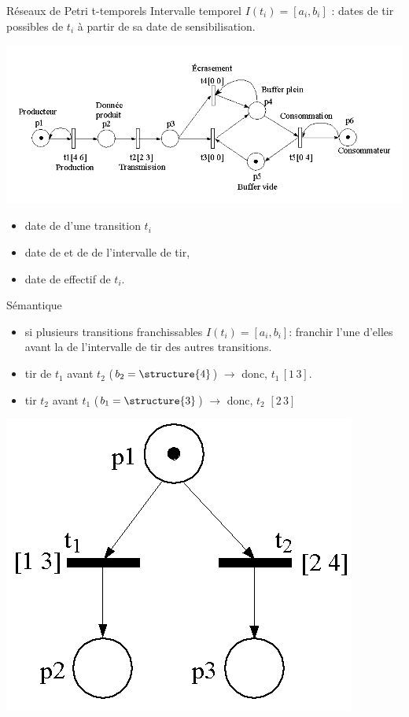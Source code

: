 \documentclass[compress]{beamer}
\begin{document}
\begin{frame}{Réseaux de Petri t-temporels}
Intervalle temporel $I(t_i)=[a_i,b_i]$ : dates de tir possibles de $t_i$ à partir de sa date de
sensibilisation.
\begin{center}
\includegraphics[width=.8\linewidth]{rdp_exo}
\end{center}
\begin{itemize}
\item date de  d'une transition $t_i$
\item date de  et de  de l'intervalle de tir,
\item date de  effectif de $t_i$.
\end{itemize}
\end{frame}

\begin{frame}{Sémantique}
\begin{itemize}
\item si plusieurs transitions franchissables $I(t_i)=[a_i,b_i]$: franchir l'une d'elles avant la
	 de l'intervalle de tir des autres transitions.
\item tir de $t_1$ avant $t_2$ ($b_2=\structure{4}$) $\rightarrow$ donc, $t_1 \, [1 \, 3]$.
\item tir $t_2$ avant $t_1$ ($b_1=\structure{3}$) $\rightarrow$ donc, $t_2$ $[2 \, 3]$
\end{itemize}
\begin{center}
	\includegraphics[width=.4\linewidth]{rdp_s_forte}
\end{center}
\end{frame}
\end{document}
